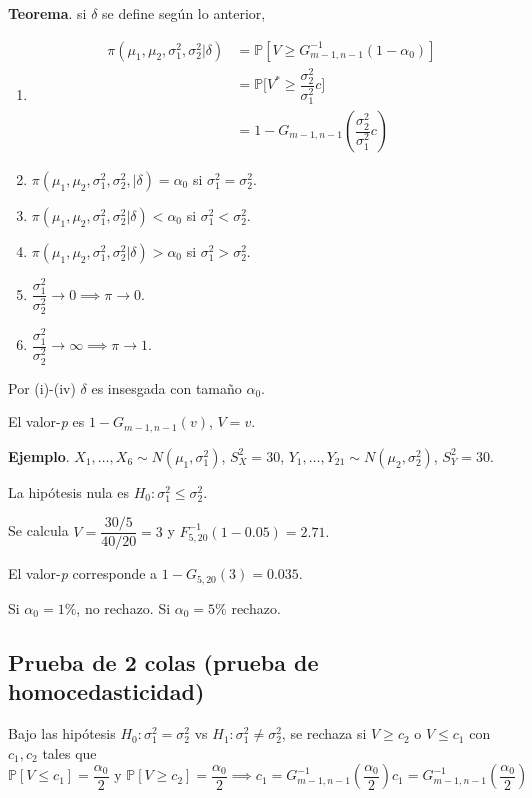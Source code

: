 \documentclass[
  12pt,
]{book}
\begin{document}
\textbf{Teorema}. si \(\delta\) se define según lo anterior,

\begin{enumerate}
\def\labelenumi{\roman{enumi}.}
\item
  \begin{align*}
  \pi(\mu_1,\mu_2,\sigma_1^2,\sigma_2^2|\delta) & = \mathbb P[V\geq G^{-1}_{m-1,n-1}(1-\alpha_0)]\\
  & = \mathbb P\bigg[V^* \geq \dfrac{\sigma_2^2}{\sigma_1^2}c\bigg]\\
  & = 1-G_{m-1,n-1}\left(\dfrac{\sigma_2^2}{\sigma_1^2}c\right)
  \end{align*}
\item
  \(\pi(\mu_1,\mu_2,\sigma_1^2,\sigma_2^2,|\delta) = \alpha_0\) si \(\sigma_1^2 = \sigma_2^2\).
\item
  \(\pi(\mu_1,\mu_2,\sigma_1^2,\sigma_2^2|\delta) < \alpha_0\) si \(\sigma_1^2 < \sigma_2^2\).
\item
  \(\pi(\mu_1,\mu_2,\sigma_1^2,\sigma_2^2|\delta) > \alpha_0\) si \(\sigma_1^2 > \sigma_2^2\).
\item
  \(\dfrac{\sigma_1^2 }{\sigma_2^2 }\to 0 \implies \pi \to 0\).
\item
  \(\dfrac{\sigma_1^2 }{\sigma_2^2 }\to \infty \implies \pi \to 1\).
\end{enumerate}

Por (i)-(iv) \(\delta\) es insesgada con tamaño \(\alpha_0\).

El valor-\emph{p} es \(1-G_{m-1,n-1}(v)\), \(V=v\).

\textbf{Ejemplo}. \(X_1,\dots,X_{6}\sim N(\mu_1,\sigma_1^2)\), \(S_X ^2 =30\), \(Y_1,\dots,Y_{21}\sim N(\mu_2,\sigma_2^2)\), \(S_Y^2=30\).

La hipótesis nula es \(H_0: \sigma_1^2\leq \sigma_2^2\).

Se calcula \(V = \dfrac{30/5}{40/20} = 3\) y \(F^{-1}_{5,20}(1-0.05) = 2.71.\)

El valor-\emph{p} corresponde a \(1-G_{5,20}(3) = 0.035.\)

Si \(\alpha_0 = 1\%\), no rechazo. Si \(\alpha_0 = 5\%\) rechazo.

\hypertarget{prueba-de-2-colas-prueba-de-homocedasticidad}{%
\subsection{Prueba de 2 colas (prueba de homocedasticidad)}\label{prueba-de-2-colas-prueba-de-homocedasticidad}}

Bajo las hipótesis \(H_0: \sigma^2_1=\sigma^2_2\) vs \(H_1: \sigma^2_1\ne\sigma^2_2\), se rechaza si \(V\geq c_2\) o \(V\leq c_1\) con \(c_1,c_2\) tales que
\[\mathbb P[V\leq c_1] = \dfrac{\alpha_0}{2} \text{ y } \mathbb P[V\geq c_2] = \dfrac{\alpha_0}{2} \implies c_1 = G_{m-1,n-1}^{-1}\left(\dfrac{\alpha_0}{2}\right) c_1 = G_{m-1,n-1}^{-1}\left(\dfrac{\alpha_0}{2}\right)\]
\end{document}
